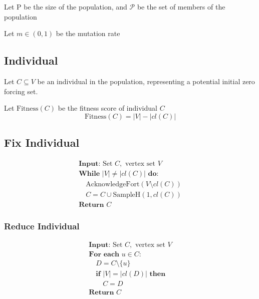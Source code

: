 \documentclass[11pt]{article}
\begin{document}
Let P be the size of the population, and $\mathcal{P}$ be the set of members of the population

Let $m \in (0, 1)$ be the mutation rate

\subsection{Individual}

Let $C \subseteq V$ be an individual in the population, representing a potential initial zero forcing set.

Let $\text{Fitness}(C)$ be the fitness score of individual $C$
$$\text{Fitness}(C) = |V| - |cl(C)|$$

\subsection{Fix Individual}

$$\begin{array}{l}
\textbf{Input:} \text{ Set } C, \text{ vertex set } V \\
\textbf{While } |V| \neq |cl(C)| \textbf{ do:} \\
\quad \text{AcknowledgeFort}(V \setminus cl(C)) \\
\quad C = C \cup \text{SampleH}(1, cl(C)) \\
\textbf{Return } C
\end{array}$$

\subsubsection{Reduce Individual}

$$\begin{array}{l}
\textbf{Input:} \text{ Set } C, \text{ vertex set } V \\
\textbf{For each } u \in C: \\
\quad D = C \setminus \{u\} \\
\quad \textbf{if } |V| = |cl(D)| \textbf{ then} \\
\quad \quad C = D \\
\textbf{Return } C
\end{array}$$
\end{document}
